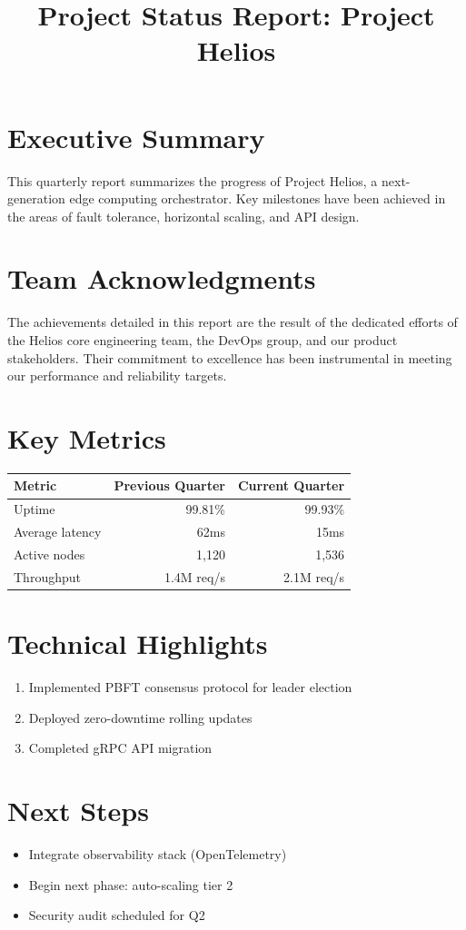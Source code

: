 \documentclass[12pt]{article}
\title{Project Status Report: Project Helios}
\author{}
\date{}
\begin{document}
\maketitle

\section{Executive Summary}
This quarterly report summarizes the progress of Project Helios, a next-generation edge computing orchestrator. Key milestones have been achieved in the areas of fault tolerance, horizontal scaling, and API design.
\section{Team Acknowledgments}
The achievements detailed in this report are the result of the dedicated efforts of the Helios core engineering team, the DevOps group, and our product stakeholders. Their commitment to excellence has been instrumental in meeting our performance and reliability targets.


\section{Key Metrics}
\begin{table}[h]
    \centering
    \begin{tabularx}{\textwidth}{Xrr}
        \toprule
        \textbf{Metric} & \textbf{Previous Quarter} & \textbf{Current Quarter} \\
        \midrule
        Uptime & 99.81\% & 99.93\% \\
        Average latency & 62ms & 15ms \\
        Active nodes & 1,120 & 1,536 \\
        Throughput & 1.4M req/s & 2.1M req/s \\
        \bottomrule
    \end{tabularx}
\end{table}

\section{Technical Highlights}
\begin{enumerate}
    \item Implemented PBFT consensus protocol for leader election
    \item Deployed zero-downtime rolling updates
    \item Completed gRPC API migration
\end{enumerate}

\section{Next Steps}
\begin{itemize}
    \item Integrate observability stack (OpenTelemetry)
    \item Begin next phase: auto-scaling tier 2
    \item Security audit scheduled for Q2
\end{itemize}
\end{document}
